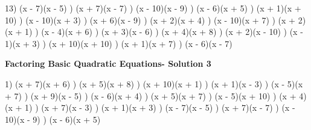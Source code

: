 \documentclass{article}%
\begin{document}
13) (x - 7)(x - 5)%
) (x + 7)(x - 7)%
) (x - 10)(x - 9)%
) (x - 6)(x + 5)%
) (x + 1)(x + 10)%
) (x - 10)(x + 3)%
) (x + 6)(x - 9)%
) (x + 2)(x + 4)%
) (x - 10)(x + 7)%
) (x + 2)(x + 1)%
) (x - 4)(x + 6)%
) (x + 3)(x - 6)%
) (x + 4)(x + 8)%
) (x + 2)(x - 10)%
) (x - 1)(x + 3)%
) (x + 10)(x + 10)%
) (x + 1)(x + 7)%
) (x - 6)(x - 7)%
\newline%
\newpage%
\large%
\begin{center}%
\textbf{Factoring Basic Quadratic Equations- Solution 3}%
\newline%
\end{center} \normalsize%
1) (x + 7)(x + 6)%
) (x + 5)(x + 8)%
) (x + 10)(x + 1)%
) (x + 1)(x - 3)%
) (x - 5)(x + 7)%
) (x + 9)(x - 5)%
) (x - 6)(x + 4)%
) (x + 5)(x + 7)%
) (x - 5)(x + 10)%
) (x + 4)(x + 1)%
) (x + 7)(x - 3)%
) (x + 1)(x + 3)%
) (x - 7)(x - 5)%
) (x + 7)(x - 7)%
) (x - 10)(x - 9)%
) (x - 6)(x + 5)%
\newline%
\end{document}
